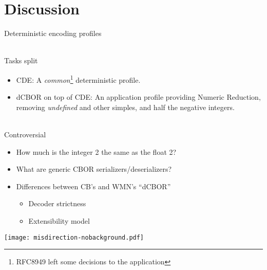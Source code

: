 \documentclass[aspectratio=169]{beamer}
\begin{document}
\section*{Discussion}

\begin{frame}{Deterministic encoding profiles}\large
    \begin{block}{\mbox{}\\Tasks split \hspace*{1em}}
    \begin{itemize}
        \item CDE: A \textit{common}\footnote{RFC8949 left some decisions to the application} deterministic profile.
        \item dCBOR on top of CDE: An application profile providing Numeric Reduction, removing \textit{undefined} and other simples, and half the negative integers.
    \end{itemize}
    \end{block}

    \bigskip

    \begin{block}{\mbox{}\\Controversial \hspace*{1em}}
    \begin{itemize}
        \item How much is the integer 2 the same as the float 2?
        \item What are generic CBOR serializers/deserializers?
        \item Differences between CB's and WMN's ``dCBOR''
            \begin{itemize}
                \item Decoder strictness
                \item Extensibility model
            \end{itemize}
    \end{itemize}
    \end{block}

    \vspace{-5em}
    \begin{block}{\texttt{[image: misdirection-nobackground.pdf]}}
    \end{block}
    \vspace{-2em}

\end{frame}
\end{document}
